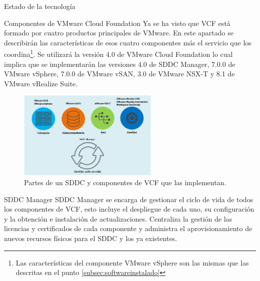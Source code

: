 \begin{section}{Estado de la tecnología}
\begin{subsection}{Componentes de VMware Cloud Foundation}
Ya se ha visto que VCF está formado por cuatro productos principales de VMware. En este apartado se describirán las características de esos cuatro componentes más el servicio que los coordina\footnote{Las características del componente VMware vSphere son las mismas que las descritas en el punto \ref*{subsec:softwareinstalado}}. Se utilizará la versión 4.0 de VMware Cloud Foundation lo cual implica que se implementarán las versiones\cite{componentesCloudFound} 4.0 de SDDC Manager, 7.0.0 de VMware vSphere, 7.0.0 de VMware vSAN, 3.0 de VMware NSX-T y 8.1 de VMware vRealize Suite.
\begin{figure}[h]
    \centering
        \includegraphics[width=0.6\textwidth]{imaxes/VCF-componentes/ComponentesVCF.png}
        \caption{Partes de un SDDC y componentes de VCF que las implementan.}
        \label{fig:componentes-funciones-VCF}
    \end{figure}
    \FloatBarrier
\begin{subsubsection}{SDDC Manager}
    SDDC Manager se encarga de gestionar el ciclo de vida de todos los componentes de VCF, esto incluye el despliegue de cada uno, su configuración y la obtención e instalación de actualizaciones. Centraliza la gestión de las licencias y certificados de cada componente y administra el aprovisionamiento de nuevos recursos físicos para el SDDC y los ya existentes.
\end{subsubsection}


\end{subsection}
\end{section}
